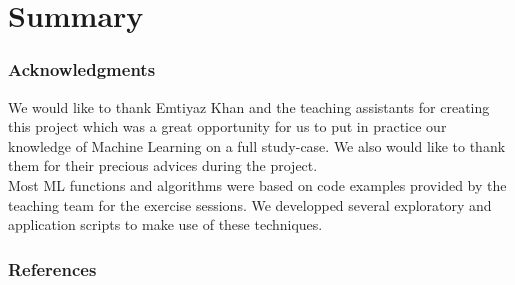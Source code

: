\documentclass{article} %
\begin{document}
\section{Summary}

\subsubsection*{Acknowledgments}
  We would like to thank Emtiyaz Khan and the teaching assistants for creating this project which was a great opportunity for us to put in practice our knowledge of Machine Learning on a full study-case. We also would like to thank them for their precious advices during the project.\\
  Most ML functions and algorithms were based on code examples provided by the teaching team for the exercise sessions. We developped several exploratory and application scripts to make use of these techniques.
\subsubsection*{References}
\end{document}
